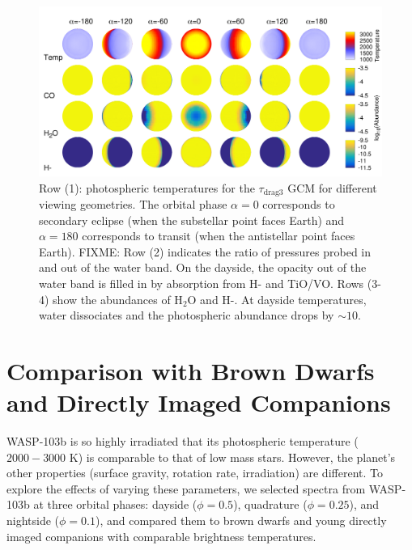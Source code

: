 \documentclass[twocolumn]{aastex61}
\begin{document}
\begin{figure}
	\includegraphics[width = 1.0\textwidth]{Figures/GCM_abundances.pdf}
	\caption{Row (1): photospheric temperatures for the $\tau_\mathrm{drag3}$ GCM for different viewing geometries.  The orbital phase $\alpha=0$ corresponds to secondary eclipse (when the substellar point faces Earth) and $\alpha=180$ corresponds to transit (when the antistellar point faces Earth). FIXME: Row (2) indicates the ratio of pressures probed in and out of the water band. On the dayside, the opacity out of the water band is filled in by absorption from H- and TiO/VO. Rows (3-4) show the abundances of H$_2$O and H-. At dayside temperatures, water dissociates and the photospheric abundance drops by $\sim10$.}
\label{fig:GCMabundance}
\end{figure}

\section{Comparison with Brown Dwarfs and Directly Imaged Companions}
\label{sec:comparison}
WASP-103b is so highly irradiated that its photospheric temperature ($2000 - 3000$ K) is comparable to that of low mass stars. However, the planet's other properties (surface gravity, rotation rate, irradiation) are different. To explore the effects of varying these parameters, we selected spectra from WASP-103b at three orbital phases: dayside ($\phi = 0.5$), quadrature ($\phi = 0.25$), and nightside ($\phi = 0.1$), and compared them to brown dwarfs and young directly imaged companions with comparable brightness temperatures.
\end{document}
